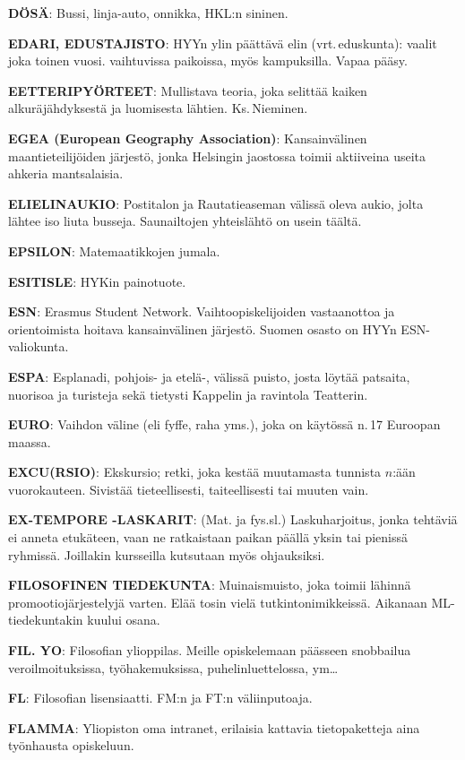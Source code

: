 \documentclass[../ala_hataile.tex]{subfiles}
\begin{document}
\textbf{DÖSÄ}: Bussi, linja-auto, onnikka, HKL:n
sininen.

\textbf{EDARI, EDUSTAJISTO}: HYYn ylin
päättävä elin (vrt.\,eduskunta): vaalit joka
toinen vuosi. vaihtuvissa paikoissa, myös
kampuksilla. Vapaa pääsy.

\textbf{EETTERIPYÖRTEET}: Mullistava teoria,
joka selittää kaiken alkuräjähdyksestä
ja luomisesta lähtien. Ks.\,Nieminen.

\textbf{EGEA (European Geography Association)}:
Kansainvälinen maantieteilijöiden
järjestö, jonka Helsingin jaostossa toimii
aktiiveina useita ahkeria mantsalaisia.

\textbf{ELIELINAUKIO}: Postitalon ja Rautatieaseman
välissä oleva aukio, jolta lähtee iso
liuta busseja. Saunailtojen yhteislähtö on
usein täältä.

\textbf{EPSILON}: Matemaatikkojen jumala.

\textbf{ESITISLE}: HYKin painotuote.

\textbf{ESN}: Erasmus Student Network. Vaihtoopiskelijoiden
vastaanottoa ja orientoimista
hoitava kansainvälinen järjestö. Suomen
osasto on HYYn ESN-valiokunta.

\textbf{ESPA}: Esplanadi, pohjois- ja etelä-, välissä
puisto, josta löytää patsaita, nuorisoa ja
turisteja sekä tietysti Kappelin ja ravintola
Teatterin.

\textbf{EURO}: Vaihdon väline (eli fyffe, raha
yms.), joka on käytössä n.\,17 Euroopan
maassa.

\textbf{EXCU(RSIO)}: Ekskursio; retki, joka kestää
muutamasta tunnista $n$:ään vuorokauteen.
Sivistää tieteellisesti, taiteellisesti tai
muuten vain.

\textbf{EX-TEMPORE -LASKARIT}: (Mat.
ja fys.sl.) Laskuharjoitus, jonka tehtäviä
ei anneta etukäteen, vaan ne ratkaistaan
paikan päällä yksin tai pienissä ryhmissä.
Joillakin kursseilla kutsutaan myös ohjauksiksi.

\textbf{FILOSOFINEN TIEDEKUNTA}: Muinaismuisto,
joka toimii lähinnä promootiojärjestelyjä
varten. Elää tosin vielä tutkintonimikkeissä.
Aikanaan ML-tiedekuntakin
kuului osana.

\textbf{FIL. YO}: Filosofian ylioppilas. Meille
opiskelemaan päässeen snobbailua veroilmoituksissa,
työhakemuksissa, puhelinluettelossa,
ym\dots

\textbf{FL}: Filosofian lisensiaatti. FM:n ja FT:n
väliinputoaja.

\textbf{FLAMMA}: Yliopiston oma intranet, erilaisia
kattavia tietopaketteja aina työnhausta
opiskeluun.
\end{document}
